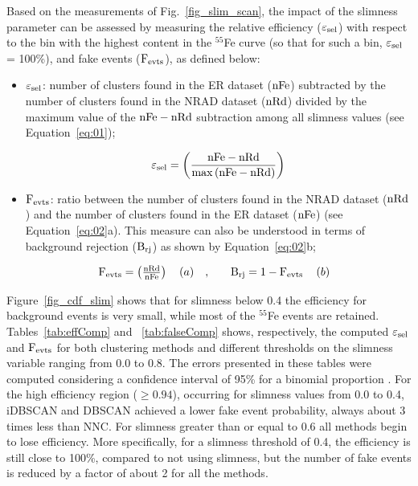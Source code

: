 \documentclass[a4paper,11pt]{article}
\begin{document}
Based on the measurements of Fig.~\ref{fig_slim_scan}, the impact of the slimness parameter can be assessed by measuring the relative efficiency ($\rm \varepsilon_{sel}$) with respect to the bin with the highest content in the $^{55}$Fe curve (so that for such a bin, $\rm \varepsilon_{sel}$ = 100\%), and fake events ($\rm F_{evts}$), as defined below:




\begin{itemize}
    \item $\rm \varepsilon_{sel}$: number of clusters found in the ER dataset ($\rm nFe$) subtracted by the number of clusters found in the NRAD dataset ($\rm nRd$) divided by the maximum value of the $\rm nFe-nRd$ subtraction among all slimness values (see Equation~\ref{eq:01});
    
    \begin{equation}
       {\rm \varepsilon_{sel} = \left( {\frac{{nFe - nRd}}{{\max \left( {nFe - nRd} \right)}}} \right)}
       \label{eq:01}
    \end{equation}

    
    \item $\rm F_{evts}$: ratio between the number of clusters found in the NRAD dataset ($\rm nRd$) and the number of clusters found in the ER dataset ($\rm  nFe$) (see Equation~\ref{eq:02}a). This measure can also be understood in terms of background rejection ($\rm B_{rj}$) as shown by Equation~\ref{eq:02}b;
    
\end{itemize}
\begin{equation}
    \begin{array}{*{20}{c}}
   \begin{array}{*{20}{c}}
   {\rm F_{evts} = \left( {\frac{{nRd}}{{nFe}}} \right)}  \\
\end{array} ~~(a) & {, ~~~} & {\rm B_{rj} = 1 - F_{evts} }  \\
\end{array} ~~(b)
\label{eq:02}
\end{equation}

Figure~\ref{fig_cdf_slim} shows that for slimness below 0.4 the efficiency for background events is very small, while most of the $^{55}$Fe events are retained.
Tables~\ref{tab:effComp} and ~\ref{tab:falseComp} shows, respectively, the computed $\rm \varepsilon_{sel}$ and $\rm F_{evts}$ for both clustering methods and different thresholds on the slimness variable ranging from 0.0 to 0.8. The errors presented in these tables were computed considering a confidence interval of 95\% for a binomial proportion \cite{brown2001interval}. For the high efficiency region ($\geq 0.94$), occurring for slimness values from 0.0 to 0.4, iDBSCAN and DBSCAN achieved a lower fake event probability, always about 3 times less than NNC. For slimness greater than or equal to 0.6 all methods begin to lose efficiency.
More specifically, for a slimness threshold of 0.4, the efficiency is still close to 100\%, compared to not using slimness, but the number of fake events is reduced by a factor of about 2 for all the methods.
\end{document}
